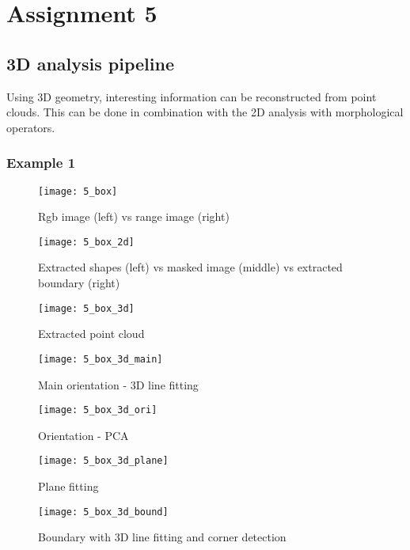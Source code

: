 \section{Assignment 5}

\subsection{3D analysis pipeline}

Using 3D geometry, interesting information can be reconstructed from point clouds. This can be done in combination with the 2D analysis with morphological operators.

\subsubsection{Example 1}

\begin{figure}[h]
\centering
\texttt{[image: 5\_box]}
\caption{Rgb image (left) vs range image (right)}
\end{figure}
\begin{figure}[h]
\centering
\texttt{[image: 5\_box\_2d]}
\caption{Extracted shapes (left) vs masked image (middle) vs extracted boundary (right)}
\end{figure}
\begin{figure}[H]
\centering
\texttt{[image: 5\_box\_3d]}
\caption{Extracted point cloud}
\end{figure}

\newpage

\begin{figure}[H]
\centering
\texttt{[image: 5\_box\_3d\_main]}
\caption{Main orientation - 3D line fitting}
\end{figure}
\begin{figure}[H]
\centering
\texttt{[image: 5\_box\_3d\_ori]}
\caption{Orientation - PCA}
\end{figure}

\newpage

\begin{figure}[H]
\centering
\texttt{[image: 5\_box\_3d\_plane]}
\caption{Plane fitting}
\end{figure}
\begin{figure}[H]
\centering
\texttt{[image: 5\_box\_3d\_bound]}
\caption{Boundary with 3D line fitting and corner detection}
\end{figure}

